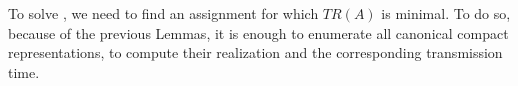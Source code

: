 \documentclass[english]{article}
\begin{document}



To solve \spall, we need to find an assignment for which $TR(A)$ is minimal. 
To do so, because of the previous Lemmas, it is enough to 
enumerate all canonical compact representations, to compute their realization and the corresponding transmission time.


\end{document}
